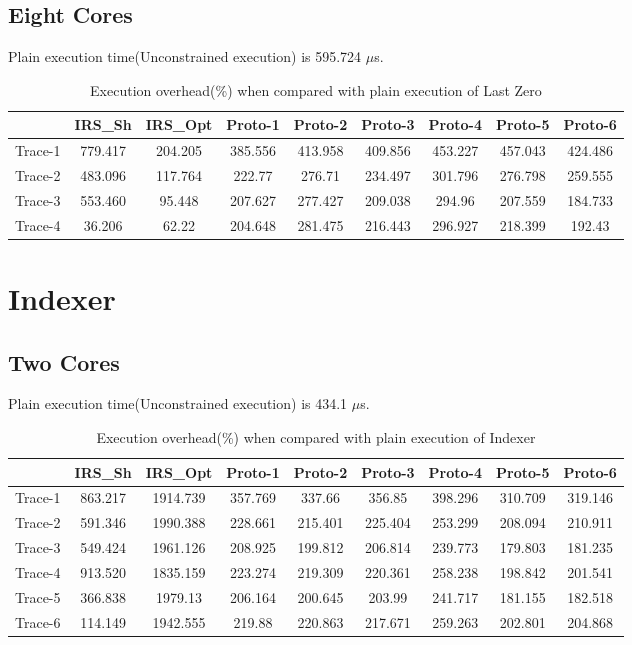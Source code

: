 \newpage
\subsection{Eight Cores}
Plain execution time(Unconstrained execution) is 595.724 $\mu$s.
\begin{table}[h]
\begin{center}
 \begin{tabular}{|c c c c c c c c c|} 
 \hline
 & IRS\_Sh & IRS\_Opt& Proto-1 & Proto-2 & Proto-3 & Proto-4 & Proto-5 & Proto-6\\ %
 \hline
Trace-1 & 779.417 & 204.205 & 385.556 & 413.958 & 409.856 & 453.227 & 457.043 & 424.486\\
Trace-2 & 483.096 & 117.764 & 222.77 & 276.71 & 234.497 & 301.796 & 276.798 & 259.555\\
Trace-3 & 553.460 & 95.448 & 207.627 & 277.427 & 209.038 & 294.96 & 207.559 & 184.733\\
Trace-4 & 36.206 & 62.22 & 204.648 & 281.475 & 216.443 & 296.927 & 218.399 & 192.43\\
\hline
\end{tabular}
\end{center}
\caption{Execution overhead(\%) when compared with plain execution of Last Zero}
\label{last_zero_irs_res_cores_8}
\end{table}

\section{Indexer}

\subsection{Two Cores}
Plain execution time(Unconstrained execution) is 434.1 $\mu$s.
\begin{table}[h]
\begin{center}
 \begin{tabular}{|c c c c c c c c c|} 
 \hline
 & IRS\_Sh & IRS\_Opt& Proto-1 & Proto-2 & Proto-3 & Proto-4 & Proto-5 & Proto-6\\ %
 \hline
Trace-1 & 863.217 & 1914.739 & 357.769 & 337.66 & 356.85 & 398.296 & 310.709 & 319.146\\
Trace-2 & 591.346 & 1990.388 & 228.661 & 215.401 & 225.404 & 253.299 & 208.094 & 210.911\\
Trace-3 & 549.424 & 1961.126 & 208.925 & 199.812 & 206.814 & 239.773 & 179.803 & 181.235\\
Trace-4 & 913.520 & 1835.159 & 223.274 & 219.309 & 220.361 & 258.238 & 198.842 & 201.541\\
Trace-5 & 366.838 & 1979.13 & 206.164 & 200.645 & 203.99 & 241.717 & 181.155 & 182.518\\
Trace-6 & 114.149 & 1942.555 & 219.88 & 220.863 & 217.671 & 259.263 & 202.801 & 204.868\\
\hline
\end{tabular}
\end{center}
\caption{Execution overhead(\%) when compared with plain execution of Indexer}
\label{indexer_irs_res_cores_2}
\end{table}
\newpage
